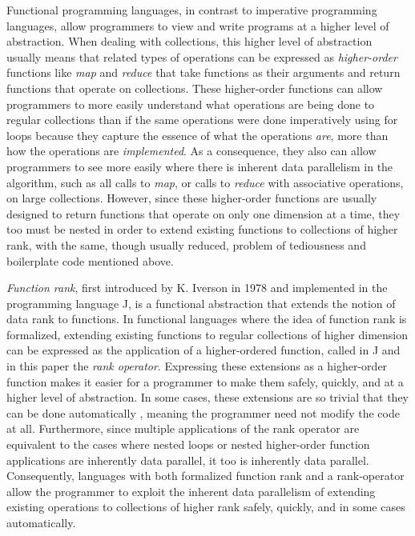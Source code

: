 Functional programming languages, in contrast to imperative programming languages, 
allow programmers to view and write programs at a higher level of abstraction.
When dealing with collections, 
this higher level of abstraction usually means that related types of operations can be expressed as \textit{higher-order} functions 
like \textit{map} and \textit{reduce} that take functions as their arguments and return functions that operate on collections.
These higher-order functions can allow programmers to more easily understand what operations are being done to regular collections 
than if the same operations were done imperatively using for loops 
because they capture the essence of what the operations \textit{are}, more than how the operations are \textit{implemented}.
As a consequence, they also can allow programmers 
to see more easily where there is inherent data parallelism in the algorithm, 
such as all calls to \textit{map}, or calls to \textit{reduce} with associative operations, on large collections.
However, since these higher-order functions are usually designed to return functions that operate on only one dimension at a time, 
they too must be nested in order to extend existing functions to collections of higher rank, 
with the same, though usually reduced, problem of tediousness and boilerplate code mentioned above.

\textit{Function rank}, first introduced by K. Iverson in 1978\cite{opandfunc} 
and implemented in the programming language J, 
is a functional abstraction that extends the notion of data rank to functions. 
In functional languages where the idea of function rank is formalized, 
extending existing functions to regular collections of higher dimension 
can be expressed as the application of a higher-ordered function, 
called in J and in this paper the \textit{rank operator}\cite{jvocab}. 
Expressing these extensions as a higher-order function 
makes it easier for a programmer to make them safely, quickly, and at a higher level of abstraction.
In some cases, these extensions are so trivial that they can be done automatically\cite{jvocab} \cite{rankanduni}, 
meaning the programmer need not modify the code at all. 
Furthermore, since multiple applications of the rank operator 
are equivalent to the cases where nested loops or nested higher-order function applications are inherently data parallel, 
it too is inherently data parallel.
Consequently, languages with both formalized function rank and a rank-operator allow the programmer to 
exploit the inherent data parallelism of extending existing operations to collections of higher rank 
safely, quickly, and in some cases automatically.


